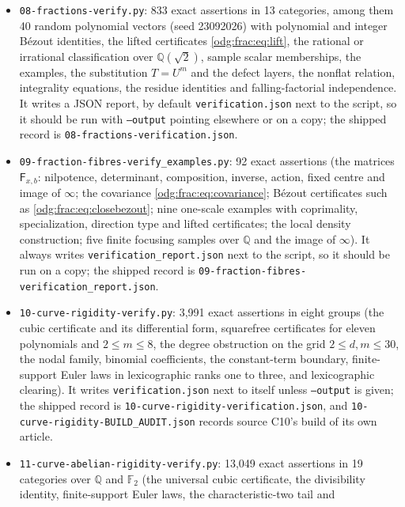 \documentclass[11pt,oneside]{article}
\numberwithin{equation}{section}
\theoremstyle{definition}
\theoremstyle{remark}
\newcommand{\Q}{\mathbb Q}
\newcommand{\fn}[1]{\nolinkurl{#1}}
\begin{document}
\begin{itemize}[leftmargin=*]
witnesses for $-100\le x\le100$, the degree of $F_4$ and its Gaussian
collapse); output to the terminal only, recorded in
\fn{07-defining-arithmetic-verification.txt}. It uses assertions and must
not be run with \texttt{python -O}.
\item \fn{08-fractions-verify.py}: 833 exact assertions in 13 categories,
among them 40 random polynomial vectors (seed 23092026) with polynomial and
integer B\'ezout identities, the lifted certificates \eqref{odg:frac:eq:lift},
the rational or irrational classification over $\Q(\sqrt2)$, sample scalar
memberships, the examples, the substitution $T=U^m$ and the defect layers, the
nonflat relation, integrality equations, the residue identities and
falling-factorial independence. It writes a JSON report, by default
\fn{verification.json} next to the script, so it should be run with
\texttt{--output} pointing elsewhere or on a copy; the shipped record is
\fn{08-fractions-verification.json}.
\item \fn{09-fraction-fibres-verify_examples.py}: 92 exact assertions (the
matrices $\mathsf F_{x,b}$: nilpotence, determinant, composition, inverse,
action, fixed centre and image of $\infty$; the covariance
\eqref{odg:frac:eq:covariance}; B\'ezout certificates such as
\eqref{odg:frac:eq:closebezout}; nine one-scale examples with coprimality,
specialization, direction type and lifted certificates; the local density
construction; five finite focusing samples over $\Q$ and the image of
$\infty$). It always writes \fn{verification_report.json} next to the
script, so it should be run on a copy; the shipped record is
\fn{09-fraction-fibres-verification_report.json}.
\item \fn{10-curve-rigidity-verify.py}: 3,991 exact assertions in eight groups (the
cubic certificate and its differential form, squarefree certificates for eleven
polynomials and $2\le m\le8$, the degree obstruction on the grid $2\le d,m\le30$, the
nodal family, binomial coefficients, the constant-term boundary, finite-support Euler
laws in lexicographic ranks one to three, and lexicographic clearing). It writes
\fn{verification.json} next to itself unless \texttt{--output} is given; the shipped
record is \fn{10-curve-rigidity-verification.json}, and
\fn{10-curve-rigidity-BUILD_AUDIT.json} records source C10's build of its own article.
\item \fn{11-curve-abelian-rigidity-verify.py}: 13,049 exact assertions in 19
categories over $\Q$ and $\mathbb F_2$ (the universal cubic certificate, the
divisibility identity, finite-support Euler laws, the characteristic-two tail and

\end{itemize}
\end{document}
